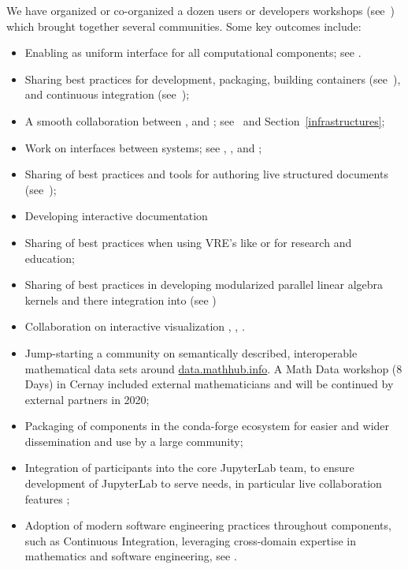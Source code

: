 \begin{compactenum}[\bf {Obj} 1\rm]
  We have organized or co-organized a dozen users or developers
  workshops (see~) which brought
  together several communities. Some key outcomes include:
  \begin{itemize}
  \item Enabling \Jupyter as uniform interface for all computational components; see .
  \item Sharing best practices for development, packaging, building containers (see~), and continuous integration (see~);
  \item A smooth collaboration between \JupyterHub, and \Simulagora; see~ and Section~\ref{infrastructures};
  \item Work on interfaces between systems; see , , and ;
  \item Sharing of best practices and tools for authoring live structured documents (see~);
  \item Developing interactive documentation
  \item Sharing of best practices when using VRE's like \cocalc or \Jupyter for research and education;
  \item Sharing of best practices in developing modularized parallel linear algebra kernels and there integration into \SageMath (see )
  \item Collaboration on interactive visualization , , .
  \item Jump-starting a community on semantically described, interoperable mathematical data sets around \url{data.mathhub.info}. A Math Data workshop (8 Days) in Cernay included external mathematicians and will be continued by external partners in 2020;
  \item Packaging of \ODK components in the conda-forge ecosystem
  for easier and wider dissemination and use by a large community;
  \item Integration of \ODK participants into the core JupyterLab team,
  to ensure development of JupyterLab to serve \ODK needs,
  in particular live collaboration features ;
  \item Adoption of modern software engineering practices throughout \ODK components,
  such as Continuous Integration,
  leveraging cross-domain expertise
  in mathematics and software engineering,
  see .
  \end{itemize}


\end{compactenum}
